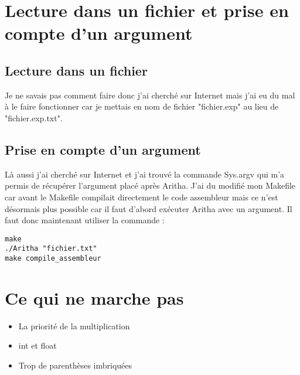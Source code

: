 \documentclass{article}
\begin{document}
\section{Lecture dans un fichier et prise en compte d'un argument}

\subsection{Lecture dans un fichier}
Je ne savais pas comment faire donc j'ai cherché sur Internet mais j'ai eu du mal à le faire fonctionner car je mettais en nom de fichier "fichier.exp" au lieu de "fichier.exp.txt".

\subsection{Prise en compte d'un argument}
Là aussi j'ai cherché sur Internet et j'ai trouvé la commande Sys.argv qui m'a permis de récupérer l'argument placé après Aritha. J'ai du modifié mon Makefile car avant le Makefile compilait directement le code assembleur mais ce n'est désormais plus possible car il faut d'abord exécuter Aritha avec un argument. Il faut donc maintenant utiliser la commande :
\begin{lstlisting}
make
./Aritha "fichier.txt"
make compile_assembleur
\end{lstlisting}

\section{Ce qui ne marche pas}
\begin{itemize}
\item La priorité de la multiplication
\item int et float
\item Trop de parenthèses imbriquées
\end{itemize}
\end{document}
